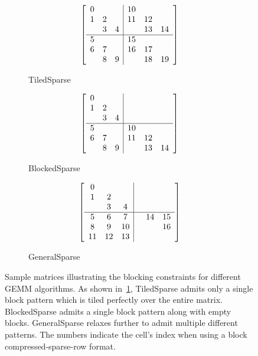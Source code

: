 \begin{figure}[tb]
  \centering
  \begin{subfigure}[b]{0.32\textwidth}
    \centering
          \[
      \left[
          \begin{array}{c c c | c c c }
          0 &   &   & 10 &   &   \\
          1 & 2 &   & 11& 12&   \\
            & 3 & 4 &   & 13& 14  \\
          \hline
          5 &   &   & 15  &   &   \\
          6 & 7 &   & 16  &17   &   \\
            & 8 & 9 &   & 18  &19   \\
          \end{array}
          \right]
      \]
    \caption{TiledSparse}
    \label{fig:tiledblocks}
  \end{subfigure}
  \begin{subfigure}[b]{0.32\textwidth}
    \centering
      \[
      \left[
          \begin{array}{c c c | c c c }
          0 &   &   &    &    &    \\
          1 & 2 &   &    &    &    \\
            & 3 & 4 &    &    &    \\
          \hline
          5 &   &   & 10 &    &    \\
          6 & 7 &   & 11 & 12 &    \\
            & 8 & 9 &    & 13 & 14 \\
          \end{array}
          \right]
      \]    \caption{BlockedSparse}
    \label{fig:blockedblocks}
  \end{subfigure}
    \begin{subfigure}[b]{0.32\textwidth}
    \centering
      \[
      \left[
          \begin{array}{c c c | c c c }
          0 &   &   &    &    &    \\
          1 & 2 &   &    &    &    \\
            & 3 & 4 &    &    &    \\
          \hline
          5  & 6  & 7  &    &  14& 15  \\
          8  & 9  & 10 &    &    & 16 \\
          11 & 12 & 13 &    &    &    \\
          \end{array}
          \right]
      \]    \caption{GeneralSparse}
    \label{fig:generalblocks}
  \end{subfigure}
  \caption{Sample matrices illustrating the blocking constraints for different GEMM algorithms. As shown in~\ref{fig:tiledblocks}, TiledSparse
  admits only a single block pattern which is tiled perfectly over the entire matrix. BlockedSparse admits a single block pattern along with empty blocks. GeneralSparse relaxes further to admit multiple different patterns. The numbers indicate the cell's index when using a block compressed-sparse-row format. }
  \label{fig:matrixblocks}

\end{figure}


